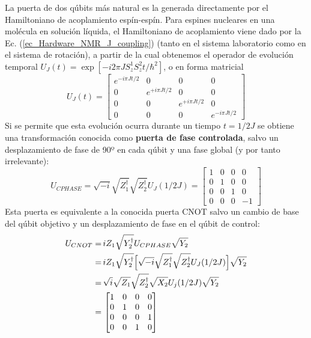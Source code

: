 \documentclass[a4paper,11pt]{book} %
\numberwithin{equation}{chapter}
\def\lc{\left[}
\def\rc{\right]}
\def\Lc{\Bigl[}
\def\Rc{\Bigr]}
\begin{document}
La puerta de dos qúbits más natural es la generada directamente por el Hamiltoniano de acoplamiento espín-espín. Para espines nucleares en una molécula en solución líquida, el Hamiltoniano de acoplamiento viene dado por la Ec. (\ref{ec_Hardware_NMR_J_coupling})  (tanto en el sistema  laboratorio como en el sistema de rotación), a partir de la cual obtenemos el operador de evolución temporal $U_J(t) = \exp \lc - i 2\pi J S_z^1 S_z^2 t /\hbar^2 \rc$, o en forma matricial
	\begin{equation} \label{ec_Hardware_NMR_UJ}
	U_J (t) = 
	\begin{bmatrix}
	e^{-i \pi Jt/2} & 0 & 0 & 0 \\
	0 & e^{+i \pi Jt/2} & 0 & 0 \\
	0 & 0 & e^{+i \pi Jt/2} & 0 \\
	0 & 0 & 0 & e^{-i \pi Jt/2}
	\end{bmatrix}
	\end{equation}
Si se permite que esta evolución ocurra durante un tiempo $t = 1/2J$ se obtiene una transformación conocida como \textbf{puerta de fase controlada}, salvo un desplazamiento de fase de 90º en cada qúbit y una fase global (y por tanto irrelevante):
	\begin{equation}
	U_{CPHASE} = \sqrt{-i} \sqrt{Z^\dagger_1} \sqrt{Z^\dagger_2} U_J (1/2J) = 
	\begin{bmatrix}
	1 & 0 & 0  & 0 \\
	0 & 1 & 0  & 0 \\
	0 & 0 & 1 & 0 \\
	0 & 0 & 0  & -1 
	\end{bmatrix}	 
	\end{equation}
Esta puerta es equivalente a la conocida puerta CNOT salvo un cambio de base del qúbit objetivo y un desplazamiento de fase en el qúbit de control:
	\begin{align} \label{ec_Hardware_NMR_implementacion_CNOT}
	U_{CNOT} = & \, i Z_1 \sqrt{Y^\dagger_2} U_{CPHASE} \sqrt{Y_2} \nonumber \\
	= & \, i Z_1 \sqrt{Y^\dagger_2} \Lc \sqrt{-i} \sqrt{Z^\dagger_1} \sqrt{Z^\dagger_2} U_J (1/2J)  \Rc \sqrt{Y_2} \nonumber \\
	= & \, \sqrt{i} \sqrt{Z_1} \sqrt{Z_2^\dagger} \sqrt{X_2} U_j (1/2J) \sqrt{Y_2}  \nonumber \\
	= & \, 
	\begin{bmatrix}
	1 & 0 & 0  & 0 \\
	0 & 1 & 0  & 0 \\
	0 & 0 & 0 & 1 \\
	0 & 0 & 1  & 0 
	\end{bmatrix}
	\end{align}
\end{document}
